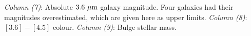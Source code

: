 \begin{table*}
\begin{center}
{\emph{Column (7)}: Absolute $3.6\rm~\mu m$ galaxy magnitude. 			Four galaxies had their magnitudes overestimated, which are given here as upper limits. 
\emph{Column (8)}: $[3.6]-[4.5]$ colour. 
\emph{Column (9)}: Bulge stellar mass. } 
\end{center}    
\end{table*}    
